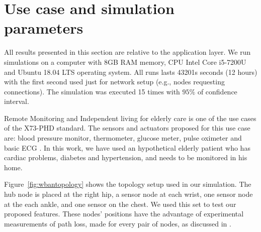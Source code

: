 \section{Use case and simulation parameters}\label{simulationparameter}
All results presented in this section are relative to the application layer. We run simulations on a computer with 8GB RAM memory, CPU Intel Core i5-7200U and Ubuntu 18.04 LTS operating system. All runs lasts 43201s seconds (12 hours) with the first second used just for network setup (e.g., nodes requesting connections). The simulation was executed 15 times with $95\%$ of confidence interval.

Remote Monitoring and Independent living for elderly care is one of the use cases of the X73-PHD standard. The sensors and actuators proposed for this use case are: blood pressure monitor, thermometer, glucose meter, pulse oximeter and basic ECG  \cite{b3}. In this work, we have used an hypothetical elderly patient who has cardiac problems, diabetes and hypertension, and needs to be monitored in his home.

Figure~\ref{fig:wbantopology} shows the topology setup used in our simulation. The hub node is placed at the right hip, a sensor node at each wrist, one sensor node at the each ankle, and one sensor on the chest. We used this set to test our proposed features. These nodes' positions have the advantage of experimental measurements of path loss, made for every pair of nodes, as discussed in \cite{b4}.

